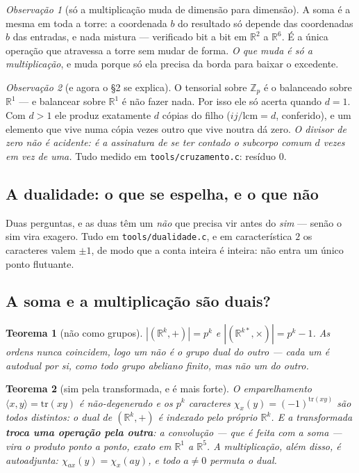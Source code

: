 \documentclass[11pt]{article}
\newcommand{\code}[1]{\texttt{\small #1}}
\newcommand{\Z}{\mathbb Z}
\newcommand{\R}{\mathbb R}
\theoremstyle{plain}
\newtheorem{teorema}{Teorema}
\theoremstyle{remark}
\newtheorem{obs}{Observação}
\begin{document}
\begin{obs}[só a multiplicação muda de dimensão para dimensão]
A soma é a mesma em toda a torre: a coordenada $b$ do resultado só depende das coordenadas $b$ das
entradas, e nada mistura --- verificado bit a bit em $\R^2$ a $\R^6$. É a única operação que atravessa
a torre sem mudar de forma. \emph{O que muda é só a multiplicação}, e muda porque só ela precisa da
borda para baixar o excedente.
\end{obs}

\begin{obs}[e agora o §2 se explica]
O tensorial sobre $\Z_p$ é o balanceado sobre $\R^1$ --- e balancear sobre $\R^1$ é não fazer nada.
Por isso ele só acerta quando $d=1$. Com $d>1$ ele produz exatamente $d$ cópias do filho
($ij/\mathrm{lcm}=d$, conferido), e um elemento que vive numa cópia vezes outro que vive noutra dá
zero. \emph{O divisor de zero não é acidente: é a assinatura de se ter contado o subcorpo comum $d$
vezes em vez de uma.} Tudo medido em \code{tools/cruzamento.c}: resíduo $0$.
\end{obs}

\subsection{A dualidade: o que se espelha, e o que não}

Duas perguntas, e as duas têm um \emph{não} que precisa vir antes do \emph{sim} --- senão o sim
vira exagero. Tudo em \code{tools/dualidade.c}, e em característica $2$ os caracteres valem $\pm1$,
de modo que a conta inteira é inteira: não entra um único ponto flutuante.

\subsection*{A soma e a multiplicação são duais?}

\begin{teorema}[não como grupos]
$|(\R^k,+)|=p^k$ e $|(\R^{k*},\times)|=p^k-1$. As ordens nunca coincidem, logo um não é o grupo dual
do outro --- cada um é autodual por si, como todo grupo abeliano finito, mas não um do outro.
\end{teorema}

\begin{teorema}[sim pela transformada, e é mais forte]
O emparelhamento $\langle x,y\rangle=\mathrm{tr}(xy)$ é não-degenerado e os $p^k$ caracteres
$\chi_x(y)=(-1)^{\mathrm{tr}(xy)}$ são todos distintos: o dual de $(\R^k,+)$ é indexado pelo próprio
$\R^k$. E a transformada \textbf{troca uma operação pela outra}: a convolução --- que é feita com a
\emph{soma} --- vira o \emph{produto} ponto a ponto, exato em $\R^1$ a $\R^5$. A multiplicação, além
disso, é autoadjunta: $\chi_{ax}(y)=\chi_x(ay)$, e todo $a\ne0$ permuta o dual.
\end{teorema}
\end{document}
